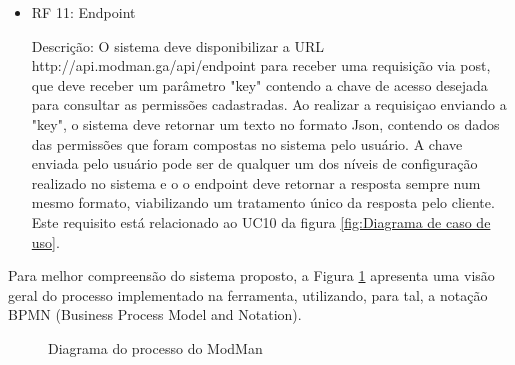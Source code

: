 \begin{itemize}
\item RF 11: Endpoint


Descrição: O sistema deve disponibilizar a URL http://api.modman.ga/api/endpoint para receber uma requisição via post, que deve receber um parâmetro "key" contendo a chave de acesso desejada para consultar as permissões cadastradas. Ao realizar a requisiçao enviando a "key", o sistema deve retornar um texto no formato Json, contendo os dados das permissões que foram compostas no sistema pelo usuário. A chave enviada pelo usuário pode ser de qualquer um dos níveis de configuração realizado no sistema e o o endpoint deve retornar a resposta sempre num mesmo formato, viabilizando um tratamento único da resposta pelo cliente. Este requisito está relacionado ao UC10 da figura \ref{fig:Diagrama de caso de uso}.


\end{itemize}


Para melhor compreensão do sistema proposto, a Figura \ref{fig:diagramaBpmn} apresenta uma visão geral do processo implementado na ferramenta, utilizando, para tal, a notação BPMN (Business Process Model and Notation).


\begin{figure} %
	\caption{Diagrama do processo do ModMan}
    \label{fig:diagramaBpmn}
\end{figure}


